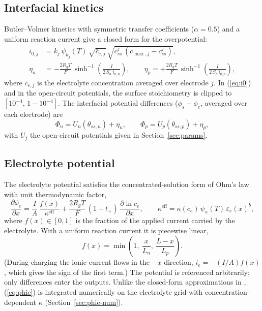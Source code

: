 \documentclass[11pt]{article}
\newcommand{\ce}{c_{e}}
\newcommand{\css}{c_{ss}}
\newcommand{\eps}{\varepsilon}
\newcommand{\pd}[2]{\frac{\partial #1}{\partial #2}}
\begin{document}
\subsection{Interfacial kinetics}
Butler--Volmer kinetics with symmetric transfer coefficients ($\alpha=0.5$) and a uniform reaction current give a closed form for the overpotential:
\begin{align}
i_{0,j}&=k_j\,\psi_{k_j}(T)\,\sqrt{\bar c_{e,j}}\,\sqrt{\css^{j}\,(c_{\max,j}-\css^{j})}, \label{eq:i0}\\
\eta_n&=-\frac{2R_gT}{F}\,\sinh^{-1}\!\left(\frac{I}{2\,S_n\,i_{0,n}}\right),\qquad
\eta_p=+\frac{2R_gT}{F}\,\sinh^{-1}\!\left(\frac{I}{2\,S_p\,i_{0,p}}\right), \label{eq:eta}
\end{align}
where $\bar c_{e,j}$ is the electrolyte concentration averaged over electrode $j$. In (\ref{eq:i0}) and in the open-circuit potentials, the surface stoichiometry is clipped to $[10^{-4},\,1-10^{-4}]$. The interfacial potential differences ($\phi_s-\phi_e$, averaged over each electrode) are
\begin{equation}
\Phi_n=U_n(\theta_{ss,n})+\eta_n,\qquad \Phi_p=U_p(\theta_{ss,p})+\eta_p, \label{eq:Phi}
\end{equation}
with $U_j$ the open-circuit potentials given in Section~\ref{sec:params}.

\subsection{Electrolyte potential}
The electrolyte potential satisfies the concentrated-solution form of Ohm's law~\cite{doyle1993} with unit thermodynamic factor,
\begin{equation}
\pd{\phi_e}{x}=\frac{I}{A}\,\frac{f(x)}{\kappa^{\mathrm{eff}}}+\frac{2R_gT}{F}\,(1-t_+)\,\pd{\ln\ce}{x},
\qquad \kappa^{\mathrm{eff}}=\kappa(\ce)\,\psi_{\kappa}(T)\,\eps_e(x)^{b}, \label{eq:phie}
\end{equation}
where $f(x)\in[0,1]$ is the fraction of the applied current carried by the electrolyte. With a uniform reaction current it is piecewise linear,
\begin{equation}
f(x)=\min\!\left(1,\ \frac{x}{L_n},\ \frac{L-x}{L_p}\right).
\end{equation}
(During charging the ionic current flows in the $-x$ direction, $i_e=-(I/A)f(x)$, which gives the sign of the first term.) The potential is referenced arbitrarily; only differences enter the outputs. Unlike the closed-form approximations in \cite{moura2017,marquis2019}, (\ref{eq:phie}) is integrated numerically on the electrolyte grid with concentration-dependent $\kappa$ (Section~\ref{sec:phie-num}).
\end{document}
